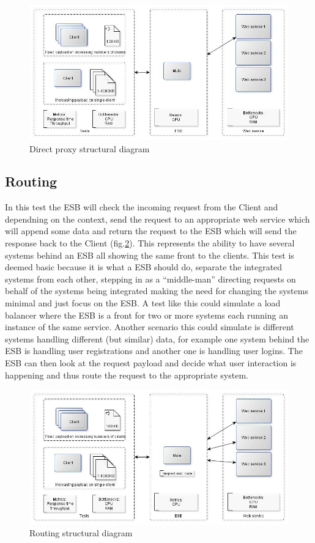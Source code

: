 \begin{figure}[H]
	\centerline{\includegraphics[scale=0.43]{img/direct_proxy}}
	\caption{Direct proxy structural diagram}
	\label{fig:proxy-diagram}
\end{figure}

\subsection{Routing}
In this test the ESB will check the incoming request from the Client and dependning on the context, send the request to an appropriate web service which will append some data and return the request to the ESB which will send the response back to the Client (fig.\ref{fig:routing-diagram}).
This represents the ability to have several systems behind an ESB all showing the same front to the clients.
This test is deemed basic because it is what a ESB should do, separate the integrated systems from each other, stepping in as a ``middle-man'' directing requests on behalf of the systems being integrated making the need for changing the systems minimal and just focus on the ESB. 
A test like this could simulate a load balancer where the ESB is a front for two or more systems each running an instance of the same service. Another scenario this could simulate is different systems handling different (but similar) data, for example one system behind the ESB is handling user registrations and another one is handling user logins. The ESB can then look at the request payload and decide what user interaction is happening and thus route the request to the appropriate system.

\begin{figure}[H]
	\centerline{\includegraphics[scale=0.43]{img/Routing}}
	\caption{Routing structural diagram}
	\label{fig:routing-diagram}
\end{figure}

